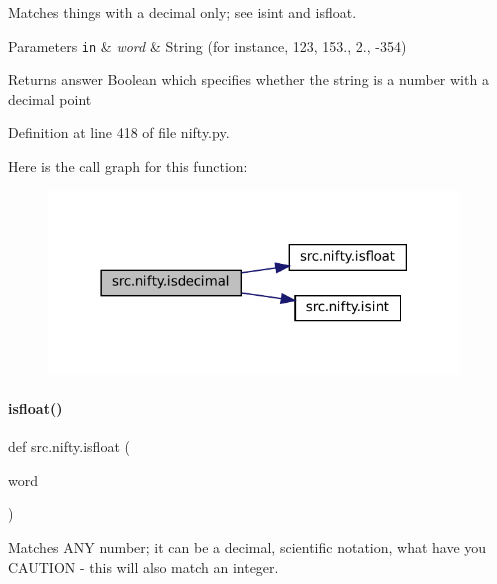 Matches things with a decimal only; see isint and isfloat. 


\begin{DoxyParams}[1]{Parameters}
\mbox{\tt in}  & {\em word} & String (for instance, \textquotesingle{}123\textquotesingle{}, \textquotesingle{}153.\textquotesingle{}, \textquotesingle{}2.\textquotesingle{}, \textquotesingle{}-\/354\textquotesingle{}) \\
\hline
\end{DoxyParams}
\begin{DoxyReturn}{Returns}
answer Boolean which specifies whether the string is a number with a decimal point 
\end{DoxyReturn}


Definition at line 418 of file nifty.\+py.

Here is the call graph for this function\+:
\nopagebreak
\begin{figure}[H]
\begin{center}
\leavevmode
\includegraphics[width=309pt]{namespacesrc_1_1nifty_aa059dcefffa25bfd0085973b14cbefbb_cgraph}
\end{center}
\end{figure}
\mbox{\label{namespacesrc_1_1nifty_a1527eb932518ec1ac5b6e879c279bf24}} 
\paragraph{\texorpdfstring{isfloat()}{isfloat()}}
{\footnotesize\ttfamily def src.\+nifty.\+isfloat (\begin{DoxyParamCaption}\item[{}]{word }\end{DoxyParamCaption})}



Matches A\+NY number; it can be a decimal, scientific notation, what have you C\+A\+U\+T\+I\+ON -\/ this will also match an integer. 



